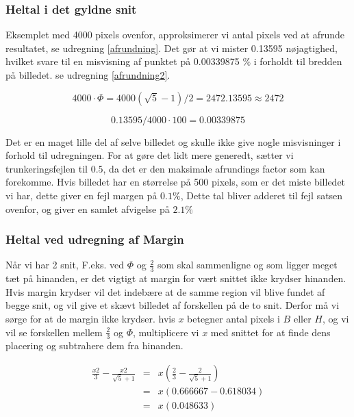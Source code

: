 \subsubsection*{Heltal i det gyldne snit}

Eksemplet med 4000 pixels ovenfor, approksimerer vi antal pixels ved at
afrunde resultatet, se udregning \ref{afrundning}. Det gør at vi mister
0.13595 nøjagtighed, hvilket svare til en misvisning af punktet på
0.00339875 $\%$ i forholdt til bredden på billedet. se udregning
\ref{afrundning2}.

\begin{equation}
	4000 \cdot \varPhi = 4000(\sqrt{5}-1)/2 = 2472.13595 \approx 2472 \label{afrundning}
\end{equation}

\begin{equation}
	0.13595/4000 \cdot 100 = 0.00339875 \label{afrundning2}
\end{equation}

Det er en maget lille del af selve billedet og skulle ikke give nogle
misvisninger i forhold til udregningen. For at gøre det lidt mere
generedt, sætter vi trunkeringsfejlen til $0.5$, da det er den maksimale
afrundings factor som kan forekomme. Hvis billedet har en størrelse på
500 pixels, som er det miste billedet vi har, dette giver en fejl margen
på $0.1\%$, Dette tal bliver adderet til fejl satsen ovenfor, og giver
en samlet afvigelse på $2.1\%$

\subsubsection{Heltal ved udregning af Margin}
Når vi har 2 snit, F.eks. ved $\varPhi$ og $\frac{2}{3}$ som skal sammenligne og
som ligger meget tæt på hinanden, er det vigtigt at margin for vært
snittet ikke krydser hinanden. Hvis margin krydser vil det indebære at de samme region
vil blive fundet af begge snit, og vil give et skævt billedet af
forskellen på de to snit. Derfor må vi sørge for at de margin ikke
krydser. hvis $x$ betegner antal pixels i $B$ eller $H$, og vi vil se
forskellen mellem $\frac{2}{3}$ og $\varPhi$, multiplicere vi $x$ med snittet for at
finde dens placering og subtrahere dem fra hinanden.

\begin{eqnarray}
	\frac{x2}{3} - \frac{x2}{\sqrt{5}+1} & = & x(\frac{2}{3} - \frac{2}{\sqrt{5} + 1}) \nonumber \\
	& = & x(0.666667-0.618034) \\ \nonumber
	& = & x(0.048633)
\end{eqnarray}

